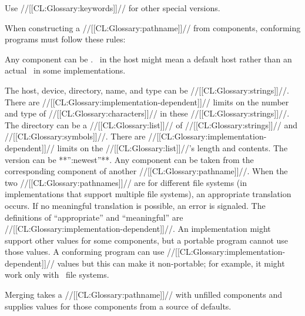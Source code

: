 \itemitem{\bull} Use //[[CL:Glossary:keywords]]// for other special versions.

\endlist

\endsubsubsubsection%

 

  When constructing a //[[CL:Glossary:pathname]]// from components, conforming programs
  must follow these rules:
   \beginlist

\itemitem{\bull}
  Any component can be \nil.
  \nil\ in the host might mean a default host 
  rather than an actual \nil\ in some implementations.
            \itemitem{\bull}

  The host, device, directory, name, and type can be //[[CL:Glossary:strings]]//.  There
  are //[[CL:Glossary:implementation-dependent]]// limits on the number and type of
  //[[CL:Glossary:characters]]// in these //[[CL:Glossary:strings]]//.
   \itemitem{\bull}
  The directory can be a //[[CL:Glossary:list]]// of //[[CL:Glossary:strings]]// and //[[CL:Glossary:symbols]]//.
  There are //[[CL:Glossary:implementation-dependent]]// limits on the //[[CL:Glossary:list]]//'s
  length and contents.
   \itemitem{\bull}
  The version can be **'':newest''**.
  \itemitem{\bull}
  Any component can be taken 
  from the corresponding component of another //[[CL:Glossary:pathname]]//.
  When the two //[[CL:Glossary:pathnames]]// are for different file systems
    (in implementations that support multiple file systems),
  an appropriate translation occurs.
  If no meaningful translation is possible,
  an error is signaled.
  The definitions of ``appropriate'' and ``meaningful'' 
  are //[[CL:Glossary:implementation-dependent]]//.
   \itemitem{\bull}
  An implementation might support other values for some components,
  but a portable program cannot use those values.
  A conforming program can use //[[CL:Glossary:implementation-dependent]]// values
  but this can make it non-portable;
  for example, it might work only with \Unix\ file systems. \endlist                                   

\endsubsubsection%

\endSubsection%

 

Merging takes a //[[CL:Glossary:pathname]]// with unfilled components and supplies values for those components from a source of defaults.

